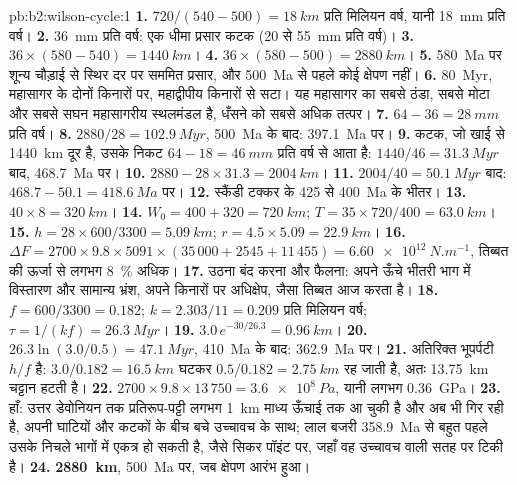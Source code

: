 \begin{solution}{pb:b2:wilson-cycle:1}
\textbf{1.} $720/(540 - 500) = \qty{18}{km}$ प्रति मिलियन वर्ष, यानी \qty{18}{mm} प्रति वर्ष।
\textbf{2.} \qty{36}{mm} प्रति वर्ष: एक धीमा प्रसार कटक (20 से \qty{55}{mm} प्रति वर्ष)।
\textbf{3.} $36\times(580 - 540) = \qty{1440}{km}$।
\textbf{4.} $36\times(580 - 500) = \qty{2880}{km}$।
\textbf{5.} \qty{580}{Ma} पर शून्य चौड़ाई से स्थिर दर पर सममित प्रसार, और
\qty{500}{Ma} से पहले कोई क्षेपण नहीं।
\textbf{6.} \qty{80}{Myr}, महासागर के दोनों किनारों पर, महाद्वीपीय किनारों से सटा। यह महासागर का
सबसे ठंडा, सबसे मोटा और सबसे सघन महासागरीय स्थलमंडल है, धँसने को सबसे अधिक तत्पर।
\textbf{7.} $64 - 36 = \qty{28}{mm}$ प्रति वर्ष।
\textbf{8.} $2880/28 = \qty{102.9}{Myr}$, \qty{500}{Ma} के बाद: \qty{397.1}{Ma} पर।
\textbf{9.} कटक, जो खाई से \qty{1440}{km} दूर है, उसके निकट $64 - 18 =
\qty{46}{mm}$ प्रति वर्ष से आता है: $1440/46 = \qty{31.3}{Myr}$ बाद, \qty{468.7}{Ma} पर।
\textbf{10.} $2880 - 28\times31.3 = \qty{2004}{km}$।
\textbf{11.} $2004/40 = \qty{50.1}{Myr}$ बाद: $468.7 - 50.1 = \qty{418.6}{Ma}$ पर।
\textbf{12.} स्कैंडी टक्कर के 425 से \qty{400}{Ma} के भीतर।
\textbf{13.} $40\times8 = \qty{320}{km}$।
\textbf{14.} $W_0 = 400 + 320 = \qty{720}{km}$; $T = 35\times720/400 = \qty{63.0}{km}$।
\textbf{15.} $h = 28\times600/3300 = \qty{5.09}{km}$; $r = 4.5\times5.09 = \qty{22.9}{km}$।
\textbf{16.} $\Delta F = 2700\times9.8\times5091\times(35\,000 + 2545 + 11\,455) =
\qty{6.60e12}{N.m^{-1}}$, तिब्बत की ऊर्जा से लगभग \qty{8}{\percent} अधिक।
\textbf{17.} उठना बंद करना और फैलना: अपने ऊँचे भीतरी भाग में विस्तारण और सामान्य भ्रंश,
अपने किनारों पर अधिक्षेप, जैसा तिब्बत आज करता है।
\textbf{18.} $f = 600/3300 = 0.182$; $k = 2.303/11 = 0.209$ प्रति मिलियन वर्ष; $\tau = 1/(kf)
= \qty{26.3}{Myr}$।
\textbf{19.} $3.0\,e^{-30/26.3} = \qty{0.96}{km}$।
\textbf{20.} $26.3\ln(3.0/0.5) = \qty{47.1}{Myr}$, \qty{410}{Ma} के बाद: \qty{362.9}{Ma} पर।
\textbf{21.} अतिरिक्त भूपर्पटी $h/f$ है: $3.0/0.182 = \qty{16.5}{km}$ घटकर $0.5/0.182 =
\qty{2.75}{km}$ रह जाती है, अतः \qty{13.75}{km} चट्टान हटती है।
\textbf{22.} $2700\times9.8\times13\,750 = \qty{3.6e8}{Pa}$, यानी लगभग \qty{0.36}{GPa}।
\textbf{23.} हाँ: उत्तर डेवोनियन तक प्रतिरूप-पट्टी लगभग \qty{1}{km} माध्य
ऊँचाई तक आ चुकी है और अब भी गिर रही है, अपनी घाटियों और कटकों के बीच बचे उच्चावच के साथ; लाल बजरी
\qty{358.9}{Ma} से बहुत पहले उसके निचले भागों में एकत्र हो सकती है, जैसे सिकर पॉइंट पर, जहाँ वह
उच्चावच वाली सतह पर टिकी है।
\textbf{24.} \textbf{\qty[text-series-to-math=true]{2880}{km}}, \qty{500}{Ma} पर, जब
क्षेपण आरंभ हुआ।
\end{solution}
